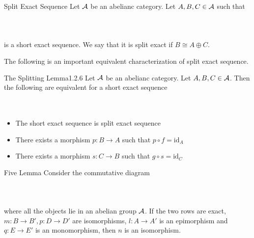 \documentclass[a4paper]{article}
\begin{document}
\begin{defn}{Split Exact Sequence}{} Let $\mathcal{A}$ be an abelianc category. Let $A,B,C\in\mathcal{A}$ such that \\~\\
\\~\\
is a short exact sequence. We say that it is split exact if $B\cong A\oplus C$. 
\end{defn}

The following is an important equivalent characterization of split exact sequence. 

\begin{thm}{The Splitting Lemma}{1.2.6} Let $\mathcal{A}$ be an abelianc category. Let $A,B,C\in\mathcal{A}$. Then the following are equivalent for a short exact sequence \\~\\
\\
\begin{itemize}
\item The short exact sequence is split exact sequence
\item There exists a morphism $p:B\to A$ such that $p\circ f=\text{id}_A$
\item There exists a morphism $s:C\to B$ such that $g\circ s=\text{id}_C$
\end{itemize} 
\end{thm}

\begin{lmm}{Five Lemma}{} Consider the commutative diagram \\~\\
\\~\\
where all the objects lie in an abelian group $\mathcal{A}$. If the two rows are exact, $m:B\to B',p:D\to D'$ are isomorphisms, $l:A\to A'$ is an epimorphism and $q:E\to E'$ is an monomorphism, then $n$ is an isomorphism. 
\end{lmm}
\end{document}

